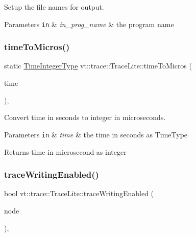 Setup the file names for output. 


\begin{DoxyParams}[1]{Parameters}
\mbox{\tt in}  & {\em in\+\_\+prog\+\_\+name} & the program name \\
\hline
\end{DoxyParams}
\mbox{\label{structvt_1_1trace_1_1_trace_lite_a89d749168b5517b592b0603c594e6fdf}} 
\subsubsection{\texorpdfstring{time\+To\+Micros()}{timeToMicros()}}
{\footnotesize\ttfamily static \hyperlink{structvt_1_1trace_1_1_trace_lite_a301955b0e2e8d76ca5974c10be8125c4}{Time\+Integer\+Type} vt\+::trace\+::\+Trace\+Lite\+::time\+To\+Micros (\begin{DoxyParamCaption}\item[{\hyperlink{namespacevt_a2b9f28078dc309ad0706b69ded743e69}{Time\+Type} const}]{time }\end{DoxyParamCaption})\hspace{0.3cm}{\ttfamily [inline]}, {\ttfamily [static]}}



Convert time in seconds to integer in microseconds. 


\begin{DoxyParams}[1]{Parameters}
\mbox{\tt in}  & {\em time} & the time in seconds as Time\+Type\\
\hline
\end{DoxyParams}
\begin{DoxyReturn}{Returns}
time in microsecond as integer 
\end{DoxyReturn}
\mbox{\label{structvt_1_1trace_1_1_trace_lite_aaf2192758f67bc57ab66766523bd96ad}} 
\subsubsection{\texorpdfstring{trace\+Writing\+Enabled()}{traceWritingEnabled()}}
{\footnotesize\ttfamily bool vt\+::trace\+::\+Trace\+Lite\+::trace\+Writing\+Enabled (\begin{DoxyParamCaption}\item[{\hyperlink{namespacevt_a866da9d0efc19c0a1ce79e9e492f47e2}{Node\+Type}}]{node }\end{DoxyParamCaption})\hspace{0.3cm}{\ttfamily [static]}, {\ttfamily [protected]}}



